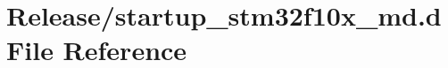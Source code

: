 \hypertarget{startup__stm32f10x__md_8d}{}\section{Release/startup\+\_\+stm32f10x\+\_\+md.d File Reference}
\label{startup__stm32f10x__md_8d}
